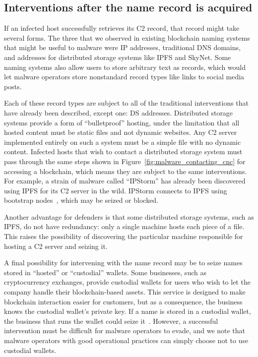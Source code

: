 \subsection{Interventions after the name record is acquired}
\label{sec:interventions_at_name}

If an infected host successfully retrieves its C2 record, 
that record might take several forms. The three that we 
observed in existing blockchain naming systems that might be 
useful to malware were IP addresses, traditional DNS domains, 
and addresses for distributed storage systems like IPFS and 
SkyNet. Some naming 
systems also allow users to store arbitrary text as 
records, which would let malware operators store nonstandard 
record types like links to social media posts. 

Each of these record types are subject to all of the 
traditional interventions that have already 
been described, except one: DS addresses. Distributed storage 
systems provide a form of ``bulletproof'' hosting, under the limitation
that all hosted content must be static files and not dynamic 
websites. Any C2 server implemented entirely on such a 
system must be a simple file with no 
dynamic content. Infected hosts that wish to contact a distributed storage 
system must pass through the same steps shown in 
Figure~\ref{fig:malware_contacting_cnc} for accessing a blockchain, which means 
they are subject to the same interventions. For example, a strain of malware 
called ``IPStorm'' has already been discovered using IPFS for its C2 server in 
the wild. IPStorm connects to IPFS using bootstrap nodes~\cite{ipstorm_anomali, 
ipstorm_zdnet}, which may be seized or blocked.

Another advantage for defenders is that some distributed storage systems, 
such as IPFS, do not have redundancy: only a single machine hosts each piece of 
a file. This raises the possibility of discovering the particular machine 
responsible for hosting a C2 server and seizing it. 

A final possibility for intervening with the name record may be to seize 
names stored in ``hosted'' or ``custodial'' wallets. Some 
businesses, such 
as cryptocurrency exchanges, provide custodial wallets for 
users who wish to let 
the company handle their blockchain-based assets. This service is designed to 
make blockchain interaction easier for customers, but as a consequence, the 
business knows the custodial wallet's private key. If a name is stored in a 
custodial wallet, the business that runs the wallet 
could seize it~\cite{pegoraro_blockchain_2021}. However, a 
successful intervention must be difficult for malware operators to 
evade, and we note that malware operators with good operational practices can 
simply choose not to use custodial wallets. 

